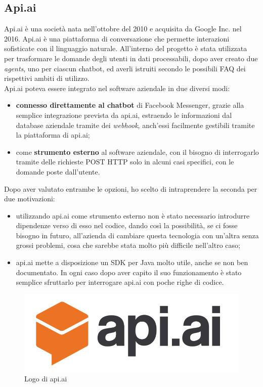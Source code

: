 \subsection{Api.ai}
Api.ai è una società nata nell'ottobre del 2010 e acquisita da Google Inc. nel 2016. Api.ai è una piattaforma di conversazione
che permette interazioni sofisticate con il linguaggio naturale. All'interno del progetto è stata utilizzata per trasformare le domande degli utenti in dati processabili, dopo aver creato due \emph{agents}, uno per ciascun \gls{chatbot}, ed averli istruiti secondo le possibili \gls{FAQ} dei rispettivi ambiti di utilizzo.\\
Api.ai poteva essere integrato nel software aziendale in due diversi modi:
\begin{itemize}
	\item \textbf{connesso direttamente al \gls{chatbot}} di Facebook Messenger, grazie alla semplice integrazione prevista da api.ai, estraendo le informazioni dal database aziendale tramite dei \emph{webhook}, anch'essi facilmente gestibili tramite la piattaforma di api.ai;
	\item come \textbf{strumento esterno} al software aziendale, con il bisogno di interrogarlo tramite delle richieste \gls{POST} HTTP solo in alcuni casi specifici, con le domande poste dall'utente.
\end{itemize} 
Dopo aver valutato entrambe le opzioni, ho scelto di intraprendere la seconda per due motivazioni:
\begin{itemize}
	\item utilizzando api.ai come strumento esterno non è stato necessario introdurre dipendenze verso di esso nel codice, dando così la possibilità, se ci fosse bisogno in futuro, all'azienda di cambiare questa tecnologia con un'altra senza grossi problemi, cosa che sarebbe stata molto più difficile nell'altro caso;
	\item api.ai mette a disposizione un \gls{SDK} per Java molto utile, anche se non ben documentato. In ogni caso dopo aver capito il suo funzionamento è stato semplice sfruttarlo per interrogare api.ai con poche righe di codice. 
\end{itemize}
\begin{figure}[h]
	\centering
	\includegraphics[scale=0.2]{../Immagini/apiai.png}
	\caption{Logo di api.ai}
\end{figure}
